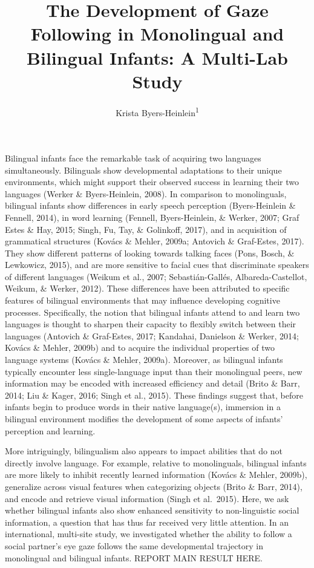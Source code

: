 \documentclass[,man,floatsintext]{apa6}
\title{The Development of Gaze Following in Monolingual and Bilingual Infants: A Multi-Lab Study}
\author{Krista Byers-Heinlein\textsuperscript{1}}
\date{}
\affiliation{
\vspace{0.5cm}
\textsuperscript{1} Concordia University}
\begin{document}
\maketitle

Bilingual infants face the remarkable task of acquiring two languages simultaneously. Bilinguals show developmental adaptations to their unique environments, which might support their observed success in learning their two languages (Werker \& Byers-Heinlein, 2008). In comparison to monolinguals, bilingual infants show differences in early speech perception (Byers-Heinlein \& Fennell, 2014), in word learning (Fennell, Byers-Heinlein, \& Werker, 2007; Graf Estes \& Hay, 2015; Singh, Fu, Tay, \& Golinkoff, 2017), and in acquisition of grammatical structures (Kovács \& Mehler, 2009a; Antovich \& Graf-Estes, 2017). They show different patterns of looking towards talking faces (Pons, Bosch, \& Lewkowicz, 2015), and are more sensitive to facial cues that discriminate speakers of different languages (Weikum et al., 2007; Sebastián-Gallés, Albareda-Castellot, Weikum, \& Werker, 2012). These differences have been attributed to specific features of bilingual environments that may influence developing cognitive processes. Specifically, the notion that bilingual infants attend to and learn two languages is thought to sharpen their capacity to flexibly switch between their languages (Antovich \& Graf-Estes, 2017; Kandahai, Danielson \& Werker, 2014; Kovács \& Mehler, 2009b) and to acquire the individual properties of two language systems (Kovács \& Mehler, 2009a). Moreover, as bilingual infants typically encounter less single-language input than their monolingual peers, new information may be encoded with increased efficiency and detail (Brito \& Barr, 2014; Liu \& Kager, 2016; Singh et al., 2015). These findings suggest that, before infants begin to produce words in their native language(s), immersion in a bilingual environment modifies the development of some aspects of infants' perception and learning.

More intriguingly, bilingualism also appears to impact abilities that do not directly involve language. For example, relative to monolinguals, bilingual infants are more likely to inhibit recently learned information (Kovács \& Mehler, 2009b), generalize across visual features when categorizing objects (Brito \& Barr, 2014), and encode and retrieve visual information (Singh et al.~2015). Here, we ask whether bilingual infants also show enhanced sensitivity to non-linguistic social information, a question that has thus far received very little attention. In an international, multi-site study, we investigated whether the ability to follow a social partner's eye gaze follows the same developmental trajectory in monolingual and bilingual infants. REPORT MAIN RESULT HERE.
\end{document}
